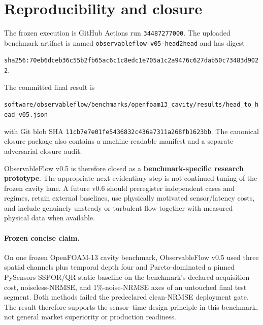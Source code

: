\documentclass[11pt]{article}
\begin{document}
\section{Reproducibility and closure}
The frozen execution is GitHub Actions run \texttt{34487277000}. The uploaded benchmark artifact is named \texttt{observableflow-v05-head2head} and has digest
\begin{center}
\texttt{sha256:70eb6dceb36c55b2fb65ac6c1c8edc1e705a1c2a9476c627dab50c73483d9022}.
\end{center}
The committed final result is
\begin{center}
\texttt{software/observableflow/benchmarks/openfoam13\_cavity/results/head\_to\_head\_v05.json}
\end{center}
with Git blob SHA \texttt{11cb7e7e01fe5436832c436a7311a268fb1623bb}. The canonical closure package also contains a machine-readable manifest and a separate adversarial closure audit.

ObservableFlow v0.5 is therefore closed as a \textbf{benchmark-specific research prototype}. The appropriate next evidentiary step is not continued tuning of the frozen cavity lane. A future v0.6 should preregister independent cases and regimes, retain external baselines, use physically motivated sensor/latency costs, and include genuinely unsteady or turbulent flow together with measured physical data when available.

\paragraph{Frozen concise claim.}
On one frozen OpenFOAM-13 cavity benchmark, ObservableFlow v0.5 used three spatial channels plus temporal depth four and Pareto-dominated a pinned PySensors SSPOR/QR static baseline on the benchmark's declared acquisition-cost, noiseless-NRMSE, and 1\%-noise-NRMSE axes of an untouched final test segment. Both methods failed the predeclared clean-NRMSE deployment gate. The result therefore supports the sensor--time design principle in this benchmark, not general market superiority or production readiness.
\end{document}
